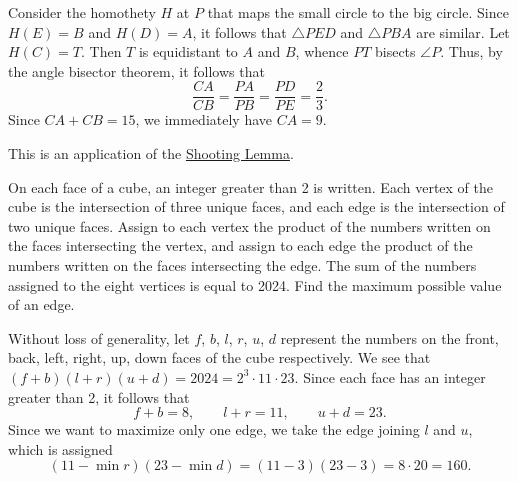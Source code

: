 \begin{solution*}
    Consider the homothety $H$ at $P$ that maps the small circle to the big circle. Since $H(E) = B$ and $H(D) = A$, it follows that $\triangle PED$ and $\triangle PBA$ are similar. Let $H(C) = T$. Then $T$ is equidistant to $A$ and $B$, whence $PT$ bisects $\angle P$. Thus, by the angle bisector theorem, it follows that \[\frac{CA}{CB} = \frac{PA}{PB} = \frac{PD}{PE} = \frac{2}{3}.\] Since $CA + CB = 15$, we immediately have $CA = 9$.

    \begin{remark}
        This is an application of the \href{https://web.evanchen.cc/handouts/GeoSlang/GeoSlang.pdf}{Shooting Lemma}.
    \end{remark}
\end{solution*}

\clearpage
\begin{question}[160]\label{A::2024-S-1-18}
    On each face of a cube, an integer greater than 2 is written. Each vertex of the cube is the intersection of three unique faces, and each edge is the intersection of two unique faces. Assign to each vertex the product of the numbers written on the faces intersecting the vertex, and assign to each edge the product of the numbers written on the faces intersecting the edge. The sum of the numbers assigned to the eight vertices is equal to 2024. Find the maximum possible value of an edge.
\end{question}
\begin{solution*}
    Without loss of generality, let $f$, $b$, $l$, $r$, $u$, $d$ represent the numbers on the front, back, left, right, up, down faces of the cube respectively. We see that $(f + b)(l + r)(u + d) = 2024 = 2^3 \cdot 11 \cdot 23$. Since each face has an integer greater than 2, it follows that \[f + b = 8, \qquad l + r = 11, \qquad u + d = 23.\] Since we want to maximize only one edge, we take the edge joining $l$ and $u$, which is assigned \[(11 - \min r)(23 - \min d) = (11-3)(23-3) = 8 \cdot 20 = 160.\]
\end{solution*}

